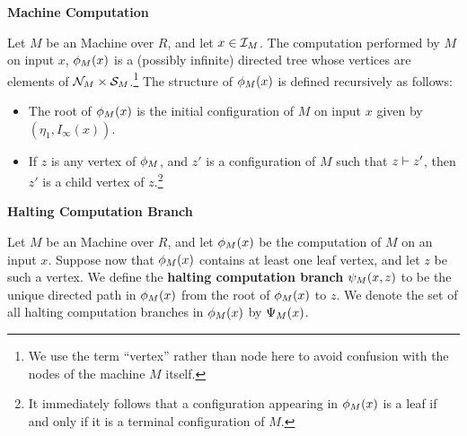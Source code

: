 \begin{definition}{\textbf{\ndet Machine Computation}}
  
  Let $M$ be an \ndet Machine over $R$, and let $x \in \mathcal{I}_M$.
  The computation performed by $M$ on input $x$, $\phi_M(x)$ is a
  (possibly infinite) directed tree whose vertices are elements of
  $\mathcal{N}_M \times \mathcal{S}_M$.\footnote{We use the term ``vertex''
    rather than node here to avoid confusion with the nodes of the
    machine $M$ itself.} The structure of $\phi_M(x)$ is defined
  recursively as follows:
  
  \begin{itemize}
  \item The root of $\phi_M(x)$ is the initial configuration of
    $M$ on input $x$ given by $(\eta_1, I_\infty(x))$.
  \item If $z$ is any vertex of $\phi_M$, and $z'$ is a
    configuration of $M$ such that $z \vdash z'$, then $z'$ is a
    child vertex of $z$.\footnote{It immediately follows that a
      configuration appearing in $\phi_M(x)$ is a leaf if and only
      if it is a terminal configuration of $M$.}
  \end{itemize}
  
\end{definition}


\begin{definition}{\textbf{Halting Computation Branch}}
  
  Let $M$ be an \ndet Machine over $R$, and let $\phi_M(x)$ be the
  computation of $M$ on an input $x$.  Suppose now that
  $\phi_M(x)$ contains at least one leaf vertex, and let $z$ be
  such a vertex.  We define the \textbf{halting computation branch}
  $\psi_M(x, z)$ to be the unique directed path in
  $\phi_M(x)$ from the root of $\phi_M(x)$ to $z$.  We denote
  the set of all halting computation branches in $\phi_M(x)$ by
  $\Psi_M(x)$.
\end{definition}

